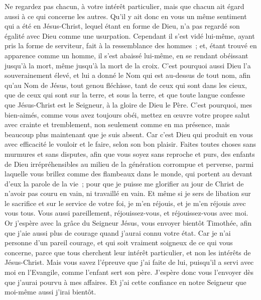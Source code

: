 \begin{multicols}{2}
Ne regardez pas chacun, à votre intérêt particulier, mais que chacun ait égard aussi à ce qui concerne les autres.
Qu'il y ait donc en vous un même sentiment qui a été en Jésus-Christ, 
lequel étant en forme de Dieu, n'a pas regardé son égalité avec Dieu comme une usurpation.
Cependant il s'est vidé lui-même, ayant pris la forme de serviteur, fait à la ressemblance des hommes~;
et, étant trouvé en apparence comme un homme, il s'est abaissé lui-même, en se rendant obéissant jusqu'à la mort, même jusqu'à la mort de la croix. 
C'est pourquoi aussi Dieu l'a souverainement élevé, et lui a donné le Nom qui est au-dessus de tout nom,
afin qu'au Nom de Jésus, tout genou fléchisse, tant de ceux qui sont dans les cieux, que de ceux qui sont sur la terre, et sous la terre,
et que toute langue confesse que Jésus-Christ est le Seigneur, à la gloire de Dieu le Père.
C'est pourquoi, mes bien-aimés, comme vous avez toujours obéi, mettez en œuvre votre propre salut avec crainte et tremblement, non seulement comme en ma présence, mais beaucoup plus maintenant que je suis absent.
Car c'est Dieu qui produit en vous avec efficacité le vouloir et le faire, selon son bon plaisir.
Faites toutes choses sans murmures et sans disputes,
afin que vous soyez sans reproche et purs, des enfants de Dieu irrépréhensibles au milieu de la génération corrompue et perverse, parmi laquelle vous brillez comme des flambeaux dans le monde, qui portent au devant d'eux la parole de la vie~; 
pour que je puisse me glorifier au jour de Christ de n'avoir pas couru en vain, ni travaillé en vain. 
Et même si je sers de libation sur le sacrifice et sur le service de votre foi, je m'en réjouis, et je m'en réjouis avec vous tous.
Vous aussi pareillement, réjouissez-vous, et réjouissez-vous avec moi.
Or j'espère avec la grâce du Seigneur Jésus, vous envoyer bientôt Timothée, afin que j'aie aussi plus de courage quand j'aurai connu votre état. 
Car je n'ai personne d'un pareil courage, et qui soit vraiment soigneux de ce qui vous concerne,
parce que tous cherchent leur intérêt particulier, et non les intérêts de Jésus-Christ. 
Mais vous savez l'épreuve que j'ai faite de lui, puisqu'il a servi avec moi en l'Evangile, comme l'enfant sert son père.
J'espère donc vous l'envoyer dès que j'aurai pourvu à mes affaires.
Et j'ai cette confiance en notre Seigneur que moi-même aussi j'irai bientôt.

\end{multicols}
